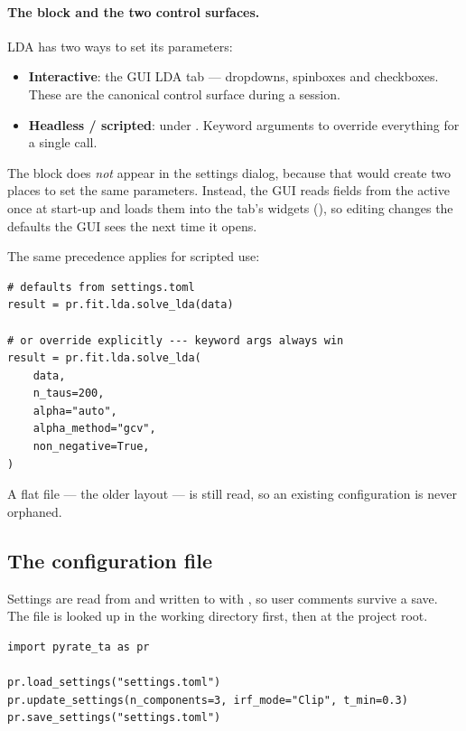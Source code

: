 \paragraph{The \code{[lda]} block and the two control surfaces.}
LDA has two ways to set its parameters:
\begin{itemize}
  \item \textbf{Interactive}: the GUI LDA tab --- dropdowns, spinboxes and
    checkboxes. These are the canonical control surface during a session.
  \item \textbf{Headless / scripted}:  under \code{[lda]}.
    Keyword arguments to  override everything for a single
    call.
\end{itemize}
\noindent
The \code{[lda]} block does \emph{not} appear in the settings dialog, because
that would create two places to set the same parameters. Instead, the GUI reads
 fields from the active  once at start-up and
loads them into the tab's widgets (),
so editing  changes the defaults the GUI sees the next time
it opens.

\noindent
The same precedence applies for scripted use:

\begin{lstlisting}
# defaults from settings.toml
result = pr.fit.lda.solve_lda(data)

# or override explicitly --- keyword args always win
result = pr.fit.lda.solve_lda(
    data,
    n_taus=200,
    alpha="auto",
    alpha_method="gcv",
    non_negative=True,
)
\end{lstlisting}

A flat file --- the older layout --- is still read, so an existing
configuration is never orphaned.

\subsection{The configuration file}

Settings are read from and written to  with ,
so user comments survive a save. The file is looked up in the working
directory first, then at the project root.

\begin{lstlisting}
import pyrate_ta as pr

pr.load_settings("settings.toml")
pr.update_settings(n_components=3, irf_mode="Clip", t_min=0.3)
pr.save_settings("settings.toml")
\end{lstlisting}

